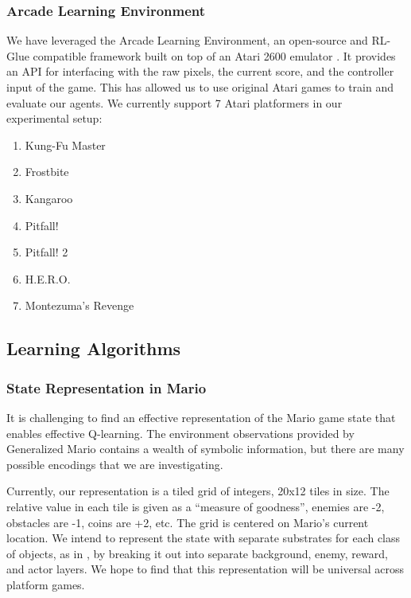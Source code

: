 \documentclass{article}
\begin{document}
\subsubsection{Arcade Learning Environment}
We have leveraged the Arcade Learning Environment, an open-source and RL-Glue compatible framework built on top of an Atari 2600 emulator \cite{bellemare13}.  It provides an API for interfacing with the raw pixels, the current score, and the controller input of the game. This has allowed us to use original Atari games to train and evaluate our agents. We currently support 7 Atari platformers in our experimental setup:
\begin{enumerate} [topsep=0pt,itemsep=-1ex,partopsep=1ex,parsep=1ex]
\item Kung-Fu Master
\item Frostbite
\item Kangaroo
\item Pitfall!
\item Pitfall! 2
\item H.E.R.O.
\item Montezuma's Revenge
\end{enumerate}

\subsection{Learning Algorithms}

\subsubsection{State Representation in Mario}
It is challenging to find an effective representation of the Mario game state that enables effective Q-learning. The environment observations provided by Generalized Mario contains a wealth of symbolic information, but there are many possible encodings that we are investigating.

Currently, our representation is a tiled grid of integers, 20x12 tiles in size. The relative value in each tile is given as a ``measure of goodness'', enemies are -2, obstacles are -1, coins are +2, etc. The grid is centered on Mario's current location. We intend to represent the state with separate substrates for each class of objects, as in \cite{Hauskneck13}, by breaking it out into separate background, enemy, reward, and actor layers. We hope to find that this representation will be universal across platform games. 
\end{document}
